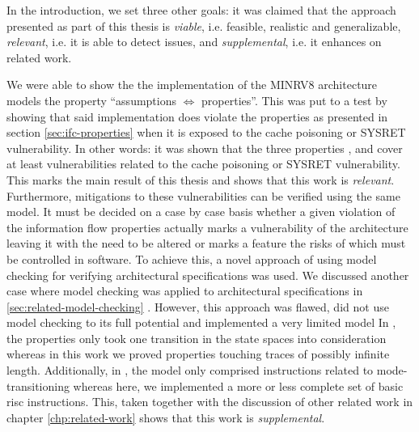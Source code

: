 In the introduction, we set three other goals: it was claimed that the approach presented as part of this thesis is \textit{viable}, i.e. feasible, realistic and generalizable, \textit{relevant}, i.e. it is able to detect issues, and \textit{supplemental}, i.e. it enhances on related work.

We were able to show the the implementation of the MINRV8 architecture models the property \enquote{assumptions $ \Leftrightarrow $ properties}.
This was put to a test by showing that said implementation does violate the properties as presented in section \ref{sec:ifc-properties} when it is exposed to the cache poisoning or SYSRET vulnerability.
In other words: it was shown that the three properties ,  and  cover at least vulnerabilities related to the cache poisoning or SYSRET vulnerability.
This marks the main result of this thesis and shows that this work is \textit{relevant}.
Furthermore, mitigations to these vulnerabilities can be verified using the same model.
It must be decided on a case by case basis whether a given violation of the information flow properties actually marks a vulnerability of the architecture leaving it with the need to be altered or marks a feature the risks of which must be controlled in software.
To achieve this, a novel approach of using model checking for verifying architectural specifications was used.
We discussed another case where model checking was applied to architectural specifications in \ref{sec:related-model-checking} \cite{BradfieldS16}.
However, this approach was flawed, did not use model checking to its full potential and implemented a very limited model
In \cite{BradfieldS16}, the properties only took one transition in the state spaces into consideration whereas in this work we proved properties touching traces of possibly infinite length.
Additionally, in \cite{BradfieldS16}, the model only comprised instructions related to mode-transitioning whereas here, we implemented a more or less complete set of basic \gls{risc} instructions.
This, taken together with the discussion of other related work in chapter \ref{chp:related-work} shows that this work is \textit{supplemental}.

